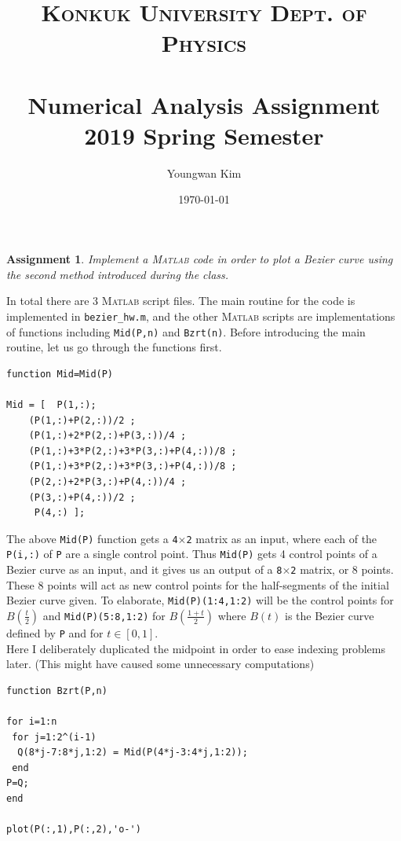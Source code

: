 \documentclass[paper=a4, fontsize=11pt]{scrartcl}
\title{	
	\normalfont \normalsize 
	\textsc{Konkuk University Dept. of Physics} \\ [25pt] %
	\horrule{1pt} \\[0.4cm] 
	\huge Numerical Analysis Assignment \\
	\vspace{0.1in}
	\Large 2019 Spring Semester
	\horrule{1pt} \\[0.4cm] 
}
\author{Youngwan Kim}
\date{\normalsize\today}
\newcommand{\MATLAB}{\textsc{Matlab}\xspace}
\newtheorem*{ass}{Assignment}
\begin{document}
	
\maketitle	


\begin{ass}
	Implement a \MATLAB code in order to plot a Bezier curve using the second method introduced during the class.
\end{ass}

\vspace{0.15in}

 In total there are 3 \MATLAB script files. The main routine for the code is implemented in \texttt{bezier\_hw.m}, and the other \MATLAB scripts are implementations of functions including \texttt{Mid(P,n)} and \texttt{Bzrt(n)}. Before introducing the main routine, let us go through the functions first.  \\

\begin{lstlisting}[caption='Mid.m']
function Mid=Mid(P)

Mid = [  P(1,:); 
	(P(1,:)+P(2,:))/2 ; 
 	(P(1,:)+2*P(2,:)+P(3,:))/4 ; 
 	(P(1,:)+3*P(2,:)+3*P(3,:)+P(4,:))/8 ;
 	(P(1,:)+3*P(2,:)+3*P(3,:)+P(4,:))/8 ;
 	(P(2,:)+2*P(3,:)+P(4,:))/4 ; 
 	(P(3,:)+P(4,:))/2 ;
 	 P(4,:) ];
\end{lstlisting}
\vspace{0.15in}

The above \texttt{Mid(P)} function gets a \texttt{4$\times$2} matrix as an input, where each of the \texttt{P(i,:)} of \texttt{P} are a single control point. Thus \texttt{Mid(P)} gets 4 control points of a Bezier curve as an input, and it gives us an output of a \texttt{8$\times$2} matrix, or 8 points. These 8 points will act as new control points for the half-segments of the initial Bezier curve given. To elaborate, \texttt{Mid(P)(1:4,1:2)} will be the control points for $B(\frac{t}{2})$ and \texttt{Mid(P)(5:8,1:2)} for $B(\frac{1+t}{2})$ where $B(t)$ is the Bezier curve defined by \texttt{P} and for $t \in [0,1]$.\\

Here I deliberately duplicated the midpoint in order to ease indexing problems later. (This might have caused some unnecessary computations)\\

\begin{lstlisting}[caption='Bzrt.m']
function Bzrt(P,n)

for i=1:n
 for j=1:2^(i-1)
  Q(8*j-7:8*j,1:2) = Mid(P(4*j-3:4*j,1:2));
 end
P=Q;
end

plot(P(:,1),P(:,2),'o-')
\end{lstlisting}
\vspace{0.15in}
\end{document}
